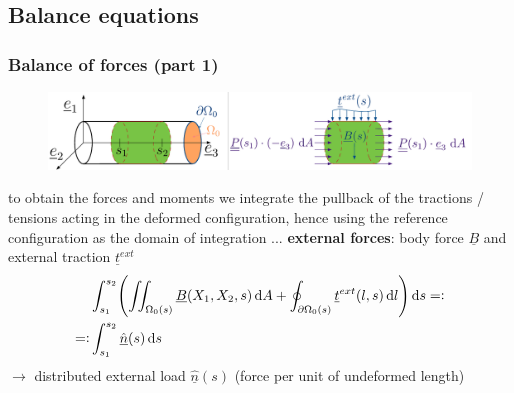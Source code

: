 \subsection{Balance equations}

\begin{frame}
  \frametitle{Balance of forces (part 1)}
  \vspace{-1em}
  \begin{figure}
    \centering
    \includegraphics[width=22cm, keepaspectratio=true]{sections/cosserat_rods/images/Forces}
  \end{figure}

  to obtain the forces and moments we integrate the pullback of the tractions / tensions acting in the deformed configuration, hence using the reference configuration as the domain of integration ... 
  \vspace{1em}
  \textbf{external forces}: body force $\underline{B}$ and external traction $\underline{t}^{ext}$
  \begin{displaymath}
    \begin{alignedat}{1}
      &\int_{s_1}^{s_2} \Biggl( \iint_{\Omega_{0}(s)} \underline{B}(X_1,X_2,s) \dif A + \oint_{\partial \Omega_{0}(s)} \underline{t}^{ext}(l,s) \dif l \Biggr) \dif s =: \\
      =: & \int_{s_1}^{s_2} \underline{\hat{n}}(s) \dif s
    \end{alignedat}
  \end{displaymath}
  \vspace{0.5em}
  $\rightarrow$ distributed external load $\underline{\hat{n}}(s)$ (force per unit of undeformed length)
\end{frame}


